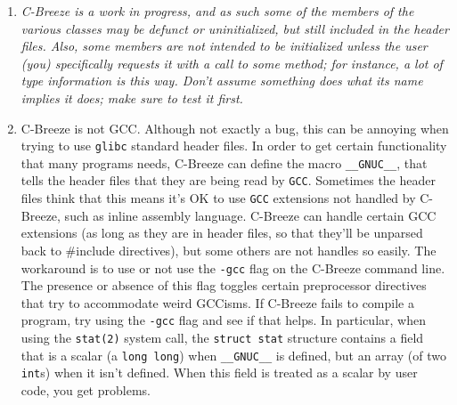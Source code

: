 \documentclass[10pt]{article}
\begin{document}
\begin{enumerate}



\item {\em C-Breeze is a work in progress, and as such some of
the members of the various classes may be defunct or uninitialized, but
still included in the header files.  Also, some members are not intended
to be initialized unless the user (you) specifically requests it with a call
to some method; for instance, a lot of type information is this way.  Don't
assume something does what its name implies it does; make sure to test it
first.}

\item C-Breeze is not GCC.  Although not exactly a bug, this can be annoying
when trying to use {\tt glibc} standard header files.  In order to get
certain functionality that many programs needs, C-Breeze can define the macro
{\tt \_\_GNUC\_\_}, that tells the header files that they are being read by
{\tt GCC}.  Sometimes the header files think that this means it's OK to use
{\tt GCC} extensions not handled by C-Breeze, such as inline assembly
language.  C-Breeze can handle certain GCC extensions (as long as they are in
header files, so that they'll be unparsed back to {\#include} directives),
but some others are not handles so easily.  The workaround is to use or not
use the {\tt -gcc} flag on the C-Breeze command line.  The presence or
absence of this flag toggles certain preprocessor directives that try to
accommodate weird GCCisms.  If C-Breeze fails to compile a program, try using
the {\tt -gcc} flag and see if that helps.  In particular, when using the
{\tt stat(2)} system call, the {\tt struct stat} structure contains a field
that is a scalar (a {\tt long long}) when {\tt \_\_GNUC\_\_} is defined, but
an array (of two {\tt int}s) when it isn't defined.  When this field is
treated as a scalar by user code, you get problems.


\end{enumerate}
\end{document}
